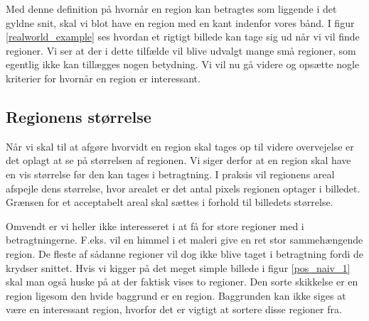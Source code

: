 {Med denne definition på hvornår en region kan betragtes som liggende i
det gyldne snit, skal vi blot have en region med en kant indenfor vores
bånd.  I figur \ref{realworld_example} ses hvordan et rigtigt billede
kan tage sig ud når vi vil finde regioner.  Vi ser at der i dette
tilfælde vil blive udvalgt mange små regioner, som egentlig ikke kan
tillægges nogen betydning.  Vi vil nu gå videre og opsætte nogle
kriterier for hvornår en region er interessant.

\subsection{Regionens størrelse}
Når vi skal til at afgøre hvorvidt en region skal tages op til videre
overvejelse er det oplagt at se på størrelsen af regionen.  Vi siger
derfor at en region skal have en vis størrelse før den kan tages i
betragtning.  I praksis vil regionens areal afspejle dens størrelse,
hvor arealet er det antal pixels regionen optager i billedet.  Grænsen
for et acceptabelt areal skal sættes i forhold til billedets størrelse.

Omvendt er vi heller ikke interesseret i at få for store regioner med i
betragtningerne.  F.eks. vil en himmel i et maleri give en ret stor
sammehængende region.  De fleste af sådanne regioner vil dog ikke blive
taget i betragtning fordi de krydser snittet.  Hvis vi kigger på det
meget simple billede i figur \ref{pos_naiv_1} skal man også huske på at
der faktisk vises to regioner. Den sorte skikkelse er en region ligesom
den hvide baggrund er en region.  Baggrunden kan ikke siges at være en
interessant region, hvorfor det er vigtigt at sortere disse regioner
fra.

}
